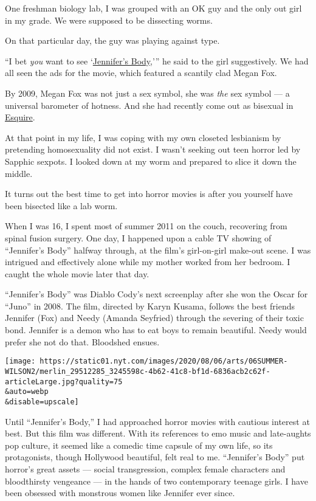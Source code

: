 One freshman biology lab, I was grouped with an OK guy and the only out
girl in my grade. We were supposed to be dissecting worms.

On that particular day, the guy was playing against type.

``I bet \emph{you} want to see
`\href{https://www.nytimes.com/2009/09/18/movies/18jennifer.html}{Jennifer's
Body},''' he said to the girl suggestively. We had all seen the ads for
the movie, which featured a scantily clad Megan Fox.

By 2009, Megan Fox was not just a sex symbol, she was \emph{the} sex
symbol --- a universal barometer of hotness. And she had recently come
out as bisexual in
\href{https://classic.esquire.com/article/2009/6/1/good-morning-megan}{Esquire}.

At that point in my life, I was coping with my own closeted lesbianism
by pretending homosexuality did not exist. I wasn't seeking out teen
horror led by Sapphic sexpots. I looked down at my worm and prepared to
slice it down the middle.

It turns out the best time to get into horror movies is after you
yourself have been bisected like a lab worm.

When I was 16, I spent most of summer 2011 on the couch, recovering from
spinal fusion surgery. One day, I happened upon a cable TV showing of
``Jennifer's Body'' halfway through, at the film's girl-on-girl make-out
scene. I was intrigued and effectively alone while my mother worked from
her bedroom. I caught the whole movie later that day.

``Jennifer's Body'' was Diablo Cody's next screenplay after she won the
Oscar for ``Juno'' in 2008. The film, directed by Karyn Kusama, follows
the best friends Jennifer (Fox) and Needy (Amanda Seyfried) through the
severing of their toxic bond. Jennifer is a demon who has to eat boys to
remain beautiful. Needy would prefer she not do that. Bloodshed ensues.

\texttt{[image: https://static01.nyt.com/images/2020/08/06/arts/06SUMMER-WILSON2/merlin\_29512285\_3245598c-4b62-41c8-bf1d-6836acb2c62f-articleLarge.jpg?quality=75\\\&auto=webp\\\&disable=upscale]}

Until ``Jennifer's Body,'' I had approached horror movies with cautious
interest at best. But this film was different. With its references to
emo music and late-aughts pop culture, it seemed like a comedic time
capsule of my own life, so its protagonists, though Hollywood beautiful,
felt real to me. ``Jennifer's Body'' put horror's great assets ---
social transgression, complex female characters and bloodthirsty
vengeance --- in the hands of two contemporary teenage girls. I have
been obsessed with monstrous women like Jennifer ever since.

